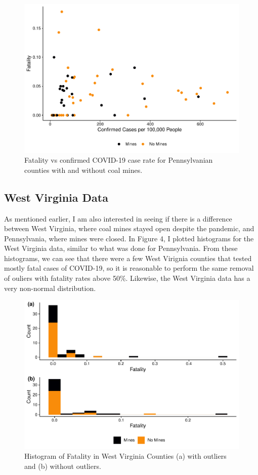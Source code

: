 \documentclass[
  12pt,
]{article}
\begin{document}
\begin{figure}
\centering
\includegraphics{Hancock_ENV872_Project_files/figure-latex/PA Fatality vs Case Rate-1.pdf}
\caption{Fatality vs confirmed COVID-19 case rate for Pennsylvanian
counties with and without coal mines.}
\end{figure}

\hypertarget{west-virginia-data}{%
\subsection{West Virginia Data}\label{west-virginia-data}}

As mentioned earlier, I am also interested in seeing if there is a
difference between West Virginia, where coal mines stayed open despite
the pandemic, and Pennsylvania, where mines were closed. In Figure 4, I
plotted histograms for the West Virginia data, similar to what was done
for Pennsylvania. From these histograms, we can see that there were a
few West Virignia counties that tested mostly fatal cases of COVID-19,
so it is reasonable to perform the same removal of ouliers with fatality
rates above 50\%. Likewise, the West Virginia data has a very non-normal
distribution.

\begin{figure}
\centering
\includegraphics{Hancock_ENV872_Project_files/figure-latex/WV Histograms-1.pdf}
\caption{Histogram of Fatality in West Virginia Counties (a) with
outliers and (b) without outliers.}
\end{figure}
\end{document}
